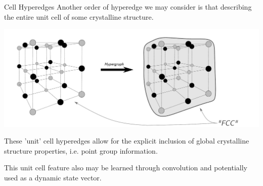 \documentclass[11pt]{beamer}
\begin{document}
\begin{frame}{Cell Hyperedges}
\small
Another order of hyperedge we may consider is that describing the entire unit cell of some crystalline structure.
\begin{center}
\includegraphics[scale=0.27]{cell_level_ex.pdf}
\end{center}
These 'unit' cell hyperedges allow for the explicit inclusion of global crystalline structure properties, i.e. point group information.

\medskip

This unit cell feature also may be learned through convolution and potentially used as a dynamic state vector.
\end{frame}
\end{document}
